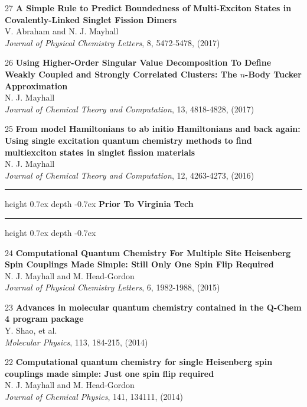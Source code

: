 \documentclass[10pt]{article}
\newenvironment{lonelist}[1][\enskip\textbullet]%
        {\vspace{-\baselineskip}\begin{list}{#1}{%
        \setlength{\partopsep}{0pt}%
        \setlength{\topsep}{0pt}}}
        {\end{list}\vspace{-.6\baselineskip}}
\def\Vhrulefill{\leavevmode\leaders\hrule height 0.7ex depth \dimexpr0.4pt-0.7ex\hfill\kern0pt}
\begin{document}
\begin{lonelist}
\item[27\hspace{4pt}] \textbf{A Simple Rule to Predict Boundedness of Multi-Exciton States in Covalently-Linked Singlet Fission Dimers}\\
V. Abraham and N. J. Mayhall\\
\textsl{Journal of Physical Chemistry Letters}, 8, 5472-5478, (2017)

\item[26\hspace{4pt}] \textbf{Using Higher-Order Singular Value Decomposition To Define Weakly Coupled and Strongly Correlated Clusters: The $n$-Body Tucker Approximation}\\
N. J. Mayhall\\
\textsl{Journal of Chemical Theory and Computation}, 13, 4818-4828, (2017)

\item[25\hspace{4pt}] \textbf{From model Hamiltonians to ab initio Hamiltonians and back again: Using single excitation quantum chemistry methods to find multiexciton states in singlet fission materials}\\
N. J. Mayhall\\
\textsl{Journal of Chemical Theory and Computation}, 12, 4263-4273, (2016)

\begin{center}
	\vspace{20pt}
	\Vhrulefill{} \textbf{Prior To Virginia Tech} {} \Vhrulefill
	\vspace{4pt}
\end{center}


\item[24\hspace{4pt}] \textbf{Computational Quantum Chemistry For Multiple Site Heisenberg Spin Couplings Made Simple: Still Only One Spin Flip Required}\\
N. J. Mayhall and M. Head-Gordon\\
\textsl{Journal of Physical Chemistry Letters}, 6, 1982-1988, (2015)


\item[23\hspace{4pt}] \textbf{Advances in molecular quantum chemistry contained in the Q-Chem 4 program package}\\
Y. Shao, et al.\\
\textsl{Molecular Physics}, 113, 184-215, (2014)

\item[22\hspace{4pt}] \textbf{Computational quantum chemistry for single Heisenberg spin couplings made simple: Just one spin flip required}\\
N. J. Mayhall and M. Head-Gordon\\
\textsl{Journal of Chemical Physics}, 141, 134111, (2014)




\end{lonelist}
\end{document}
